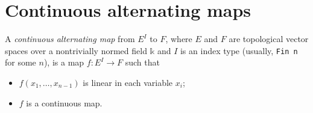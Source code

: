 \chapter{Continuous alternating maps}

\begin{definition}%
  \label{def:cont-alt-map}
  \leanok%
  A \emph{continuous alternating map} from \(E^{I}\) to \(F\),
  where \(E\) and \(F\) are topological vector spaces
  over a nontrivially normed field \(\mathbb k\)
  and \(I\) is an index type (usually, \texttt{Fin n} for some \(n\)),
  is a map \(f\colon E^{I} \to F\) such that
  \begin{itemize}
  \item \(f(x_{1}, \dots, x_{n - 1})\) is linear in each variable \(x_{i}\);
  \item \(f\) is a continuous map.
  \end{itemize}
\end{definition}
